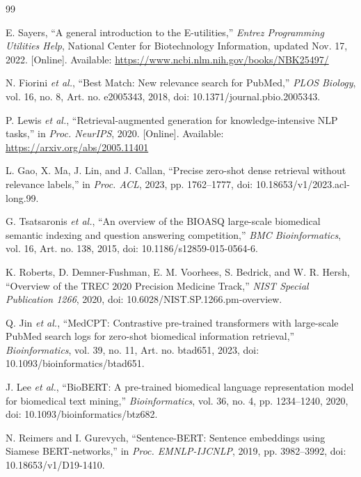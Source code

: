 \cleardoublepage
{}
{}
\renewcommand{\bibname}{References}
\begin{thebibliography}{99}

E. Sayers, ``A general introduction to the E-utilities,'' \textit{Entrez Programming Utilities Help}, National Center for Biotechnology Information, updated Nov. 17, 2022. [Online]. Available: \url{https://www.ncbi.nlm.nih.gov/books/NBK25497/}

N. Fiorini \textit{et al.}, ``Best Match: New relevance search for PubMed,'' \textit{PLOS Biology}, vol. 16, no. 8, Art. no. e2005343, 2018, doi: 10.1371/journal.pbio.2005343.

P. Lewis \textit{et al.}, ``Retrieval-augmented generation for knowledge-intensive NLP tasks,'' in \textit{Proc. NeurIPS}, 2020. [Online]. Available: \url{https://arxiv.org/abs/2005.11401}

L. Gao, X. Ma, J. Lin, and J. Callan, ``Precise zero-shot dense retrieval without relevance labels,'' in \textit{Proc. ACL}, 2023, pp. 1762--1777, doi: 10.18653/v1/2023.acl-long.99.

G. Tsatsaronis \textit{et al.}, ``An overview of the BIOASQ large-scale biomedical semantic indexing and question answering competition,'' \textit{BMC Bioinformatics}, vol. 16, Art. no. 138, 2015, doi: 10.1186/s12859-015-0564-6.

K. Roberts, D. Demner-Fushman, E. M. Voorhees, S. Bedrick, and W. R. Hersh, ``Overview of the TREC 2020 Precision Medicine Track,'' \textit{NIST Special Publication 1266}, 2020, doi: 10.6028/NIST.SP.1266.pm-overview.

Q. Jin \textit{et al.}, ``MedCPT: Contrastive pre-trained transformers with large-scale PubMed search logs for zero-shot biomedical information retrieval,'' \textit{Bioinformatics}, vol. 39, no. 11, Art. no. btad651, 2023, doi: 10.1093/bioinformatics/btad651.

J. Lee \textit{et al.}, ``BioBERT: A pre-trained biomedical language representation model for biomedical text mining,'' \textit{Bioinformatics}, vol. 36, no. 4, pp. 1234--1240, 2020, doi: 10.1093/bioinformatics/btz682.

N. Reimers and I. Gurevych, ``Sentence-BERT: Sentence embeddings using Siamese BERT-networks,'' in \textit{Proc. EMNLP-IJCNLP}, 2019, pp. 3982--3992, doi: 10.18653/v1/D19-1410.


\end{thebibliography}
